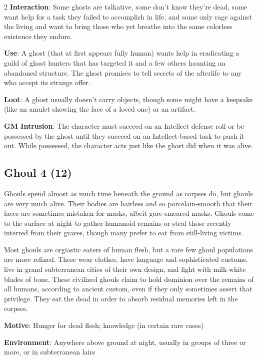 \begin{multicols}{2}
\textbf{Interaction}: Some ghosts are talkative, some don’t know they’re dead, some want help for a task they failed to accomplish in life, and some only rage against the living and want to bring those who yet breathe into the same colorless existence they endure.

\textbf{Use}: A ghost (that at first appears fully human) wants help in eradicating a guild of ghost hunters that has targeted it and a few others haunting an abandoned structure. The ghost promises to tell secrets of the afterlife to any who accept its strange offer.

\textbf{Loot}: A ghost usually doesn’t carry objects, though some might have a keepsake (like an amulet showing the face of a loved one) or an artifact.

\textbf{GM Intrusion}: The character must succeed on an Intellect defense roll or be possessed by the ghost until they succeed on an Intellect-based task to push it out. While possessed, the character acts just like the ghost did when it was alive.

\subsection{Ghoul	4 (12)}

Ghouls spend almost as much time beneath the ground as corpses do, but ghouls are very much alive. Their bodies are hairless and so porcelain-smooth that their faces are sometimes mistaken for masks, albeit gore-smeared masks. Ghouls come to the surface at night to gather humanoid remains or steal those recently interred from their graves, though many prefer to eat from still-living victims.

Most ghouls are orgiastic eaters of human flesh, but a rare few ghoul populations are more refined. These wear clothes, have language and sophisticated customs, live in grand subterranean cities of their own design, and fight with milk-white blades of bone. These civilized ghouls claim to hold dominion over the remains of all humans, according to ancient custom, even if they only sometimes assert that privilege. They eat the dead in order to absorb residual memories left in the corpses.

\textbf{Motive}: Hunger for dead flesh; knowledge (in certain rare cases)

\textbf{Environment}: Anywhere above ground at night, usually in groups of three or more, or in subterranean lairs


\end{multicols}
